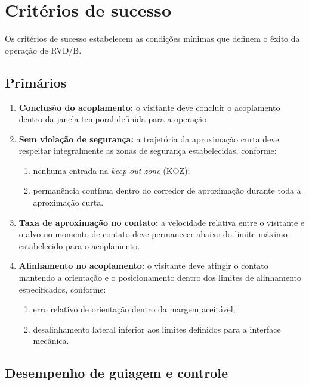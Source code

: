 \section{Critérios de sucesso}
\label{sec:criterios_sucesso}

Os critérios de sucesso estabelecem as condições mínimas que definem o êxito da operação de RVD/B.

\subsection{Primários}

\begin{enumerate}[label=(\roman*), leftmargin=*, itemsep=0pt]
\item \textbf{Conclusão do acoplamento:} o visitante deve concluir o acoplamento dentro da janela temporal definida para a operação.

\item \textbf{Sem violação de segurança:} a trajetória da aproximação curta deve respeitar integralmente as zonas de segurança estabelecidas, conforme:
    \begin{enumerate}[label=(\alph*), itemsep=0pt]
    \item nenhuma entrada na \textit{keep-out zone} (KOZ);  
    \item permanência contínua dentro do corredor de aproximação durante toda a aproximação curta.
    \end{enumerate}

\item \textbf{Taxa de aproximação no contato:} a velocidade relativa entre o visitante e o alvo no momento de contato deve permanecer abaixo do limite máximo estabelecido para o acoplamento.

\item \textbf{Alinhamento no acoplamento:} o visitante deve atingir o contato mantendo a orientação e o posicionamento dentro dos limites de alinhamento especificados, conforme:
    \begin{enumerate}[label=(\alph*), itemsep=0pt]
    \item erro relativo de orientação dentro da margem aceitável;  
    \item desalinhamento lateral inferior aos limites definidos para a interface mecânica.
    \end{enumerate}
\end{enumerate}

\subsection{Desempenho de guiagem e controle}

